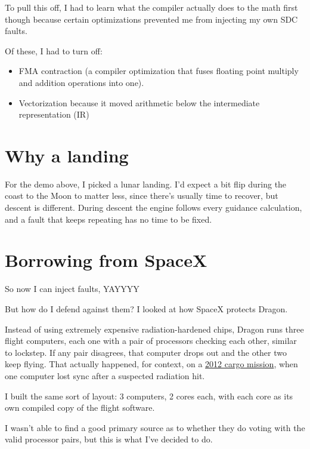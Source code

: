To pull this off, I had to learn what the compiler actually does to the math first though because certain optimizations prevented me from injecting my own SDC faults.

Of these, I had to turn off:

\begin{itemize}
\item FMA contraction (a compiler optimization that fuses floating point multiply and addition operations into one).
\item Vectorization because it moved arithmetic below the intermediate representation (IR)
\end{itemize}

\section{Why a landing}

For the demo above, I picked a lunar landing. I'd expect a bit flip during the coast to the Moon to matter less, since there's usually time to recover, but descent is different. During descent the engine follows every guidance calculation, and a fault that keeps repeating has no time to be fixed.

\section{Borrowing from SpaceX}

So now I can inject faults, YAYYYY

But how do I defend against them? I looked at how SpaceX protects Dragon.

Instead of using extremely expensive radiation-hardened chips, Dragon runs three flight computers, each one with a pair of processors checking each other, similar to lockstep. If any pair disagrees, that computer drops out and the other two keep flying. That actually happened, for context, on a \href{https://www.americaspace.com/2012/12/02/in-spite-of-octobers-mishap-spacexs-computers-are-a-go/}{2012 cargo mission}, when one computer lost sync after a suspected radiation hit.

I built the same sort of layout: 3 computers, 2 cores each, with each core as its own compiled copy of the flight software.

I wasn't able to find a good primary source as to whether they do voting with the valid processor pairs, but this is what I've decided to do.


